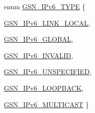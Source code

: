 \begin{DoxyCompactItemize}
enum \hyperlink{a00534_a00c060a93ce3ad909cef83066fef046b}{GSN\_\-IPv6\_\-TYPE} \{ \par
\hyperlink{a00534_a00c060a93ce3ad909cef83066fef046bad3170b5a0220495ada1fccfcb0e6006d}{GSN\_\-IPv6\_\-LINK\_\-LOCAL}, 
\par
\hyperlink{a00534_a00c060a93ce3ad909cef83066fef046badad41d83199dda41c6c880e1f0233bf7}{GSN\_\-IPv6\_\-GLOBAL}, 
\par
\hyperlink{a00534_a00c060a93ce3ad909cef83066fef046ba7a1239fa60f688ee1392d15a937ce945}{GSN\_\-IPv6\_\-INVALID}, 
\par
\hyperlink{a00534_a00c060a93ce3ad909cef83066fef046ba97fbed39f3562817d94f0c16a41dbf04}{GSN\_\-IPv6\_\-UNSPECIFIED}, 
\par
\hyperlink{a00534_a00c060a93ce3ad909cef83066fef046ba9eeb7bbadb9161482c1c526a4e0ebe46}{GSN\_\-IPv6\_\-LOOPBACK}, 
\par
\hyperlink{a00534_a00c060a93ce3ad909cef83066fef046ba6204bec4fee8f931e0eb72057cf8e46a}{GSN\_\-IPv6\_\-MULTICAST}
 \}
\end{DoxyCompactItemize}
